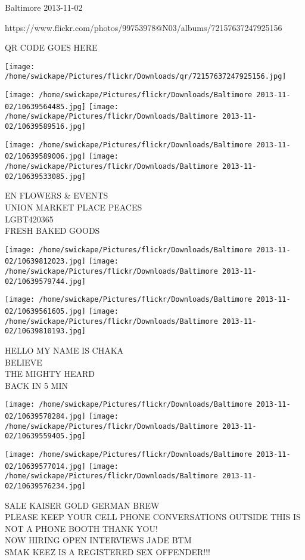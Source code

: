 \documentclass[10pt,letterpaper]{article}
\begin{document}
Baltimore 2013-11-02

https://www.flickr.com/photos/99753978@N03/albums/72157637247925156

QR CODE GOES HERE

\texttt{[image: /home/swickape/Pictures/flickr/Downloads/qr/72157637247925156.jpg]}
\pagebreak

\texttt{[image: /home/swickape/Pictures/flickr/Downloads/Baltimore 2013-11-02/10639564485.jpg]}
\texttt{[image: /home/swickape/Pictures/flickr/Downloads/Baltimore 2013-11-02/10639589516.jpg]}

\texttt{[image: /home/swickape/Pictures/flickr/Downloads/Baltimore 2013-11-02/10639589006.jpg]}
\texttt{[image: /home/swickape/Pictures/flickr/Downloads/Baltimore 2013-11-02/10639533085.jpg]}

EN FLOWERS \& EVENTS\\
UNION MARKET PLACE PEACES\\
LGBT420365\\
FRESH BAKED GOODS\\
\pagebreak

\texttt{[image: /home/swickape/Pictures/flickr/Downloads/Baltimore 2013-11-02/10639812023.jpg]}
\texttt{[image: /home/swickape/Pictures/flickr/Downloads/Baltimore 2013-11-02/10639579744.jpg]}

\texttt{[image: /home/swickape/Pictures/flickr/Downloads/Baltimore 2013-11-02/10639561605.jpg]}
\texttt{[image: /home/swickape/Pictures/flickr/Downloads/Baltimore 2013-11-02/10639810193.jpg]}

HELLO MY NAME IS CHAKA\\
BELIEVE\\
THE MIGHTY HEARD\\
BACK IN 5 MIN\\
\pagebreak

\texttt{[image: /home/swickape/Pictures/flickr/Downloads/Baltimore 2013-11-02/10639578284.jpg]}
\texttt{[image: /home/swickape/Pictures/flickr/Downloads/Baltimore 2013-11-02/10639559405.jpg]}

\texttt{[image: /home/swickape/Pictures/flickr/Downloads/Baltimore 2013-11-02/10639577014.jpg]}
\texttt{[image: /home/swickape/Pictures/flickr/Downloads/Baltimore 2013-11-02/10639576234.jpg]}

SALE KAISER GOLD GERMAN BREW\\
PLEASE KEEP YOUR CELL PHONE CONVERSATIONS OUTSIDE THIS IS NOT A PHONE BOOTH THANK YOU!\\
NOW HIRING OPEN INTERVIEWS JADE BTM\\
SMAK KEEZ IS A REGISTERED SEX OFFENDER!!!\\
\pagebreak
\end{document}
